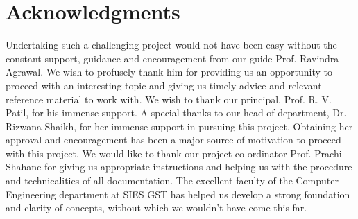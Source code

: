 


\thispagestyle{empty}
\pagestyle{empty}



\chapter*{Acknowledgments}
\vspace{0.2in}
\hspace{0.9cm} Undertaking such a challenging project would not have been easy without the constant support, guidance and encouragement from our guide Prof. Ravindra Agrawal. We wish to profusely thank him for providing us an opportunity to proceed with an interesting topic and giving us timely advice and relevant reference material to work with. We wish to thank our principal, Prof. R. V. Patil, for his immense support. A special thanks to our head of department, Dr. Rizwana Shaikh, for her immense support in pursuing this project. Obtaining her approval and encouragement has been a major source of motivation to proceed with this project. We would like to thank our project co-ordinator Prof. Prachi Shahane for giving us appropriate instructions and helping us with the procedure and technicalities of all documentation. The excellent faculty of the Computer Engineering department at SIES GST has helped us develop a strong foundation and clarity of concepts, without which we wouldn't have come this far.


